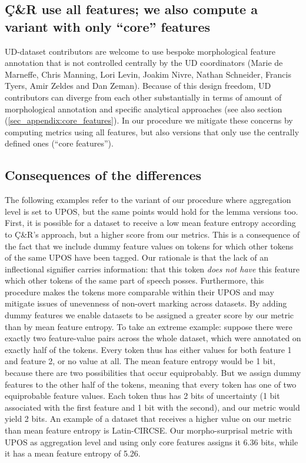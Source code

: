 \documentclass[USenglish]{article}
\begin{document}
\subsection{Ç\&R use all features; we also compute a variant with only ``core'' features}\label{appendic:differences_core_features}
 UD-dataset contributors are welcome to use bespoke morphological feature annotation that is not controlled centrally by the UD coordinators (Marie de Marneffe, Chris Manning, Lori Levin, Joakim Nivre, Nathan Schneider, Francis Tyers, Amir Zeldes and Dan Zeman). 
 Because of this design freedom, UD contributors can diverge from each other substantially in terms of amount of morphological annotation and specific analytical approaches (see also section (\ref{sec_appendix:core_features}).
 In our procedure we mitigate these concerns by computing metrics using all features, but also versions that only use the centrally defined ones (``core features'').
 
\FloatBarrier
\subsection{Consequences of the differences}\label{subsec:appendixConsequences}

The following examples refer to the variant of our procedure where aggregation level is set to UPOS, but the same points would hold for the lemma versions too.
First, it is possible for a dataset to receive a low mean feature entropy according to Ç\&R's approach, but a higher score from our metrics.
This is a consequence of the fact that we include dummy feature values on tokens for which other tokens of the same UPOS have been tagged.
Our rationale is that the lack of an inflectional signifier carries information: that this token \textit{does not have} this feature which other tokens of the same part of speech posses.
Furthermore, this procedure makes the tokens more comparable within their UPOS and may mitigate issues of unevenness of non-overt marking across datasets.
By adding dummy features we enable datasets to be assigned a greater score by our metric than by mean feature entropy.
To take an extreme example: suppose there were exactly two feature-value pairs across the whole dataset, which were annotated on exactly half of the tokens.
Every token thus has either values for both feature 1 and feature 2, or no value at all.
The mean feature entropy would be 1 bit, because there are two possibilities that occur equiprobably.
But we assign dummy features to the other half of the tokens, meaning that every token has one of two equiprobable feature values.
Each token thus has 2 bits of uncertainty (1 bit associated with the first feature and 1 bit with the second), and our metric would yield 2 bits.
An example of a dataset that receives a higher value on our metric than mean feature entropy is Latin-CIRCSE.
Our morpho-surprisal metric with UPOS as aggregation level and using only core features assigns it 6.36 bits, while it has a mean feature entropy of 5.26.
\end{document}
